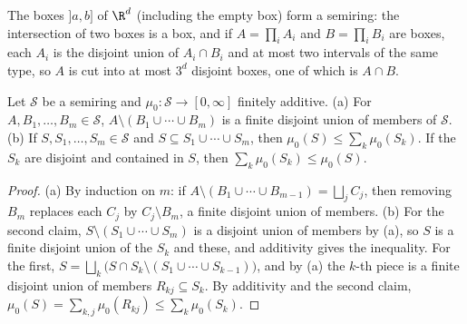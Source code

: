 The boxes $]a,b]$ of $\R^d$ (including the empty box) form a semiring: the intersection of two boxes is a box, and if $A=\prod_iA_i$ and $B=\prod_iB_i$ are boxes, each
$A_i$ is the disjoint union of $A_i\cap B_i$ and at most two intervals of the same type, so $A$ is cut into at most $3^d$ disjoint boxes, one of which is $A\cap B$.

\begin{lemma}\label{lem:semiring}
Let $\mathcal S$ be a semiring and $\mu_0:\mathcal S\to[0,\infty]$ finitely additive. (a) For $A,B_1,\dots,B_m\in\mathcal S$, $A\setminus(B_1\cup\cdots\cup B_m)$ is a finite disjoint union of members of $\mathcal S$.
(b) If $S,S_1,\dots,S_m\in\mathcal S$ and $S\subseteq S_1\cup\cdots\cup S_m$, then $\mu_0(S)\le\sum_k\mu_0(S_k)$. If the $S_k$ are disjoint and contained in $S$, then $\sum_k\mu_0(S_k)\le\mu_0(S)$.
\end{lemma}
\begin{proof}
(a) By induction on $m$: if $A\setminus(B_1\cup\cdots\cup B_{m-1})=\bigsqcup_jC_j$, then removing $B_m$ replaces each $C_j$ by $C_j\setminus B_m$, a finite disjoint union of members.
(b) For the second claim, $S\setminus(S_1\cup\cdots\cup S_m)$ is a disjoint union of members by (a), so $S$ is a finite disjoint union of the $S_k$ and these, and additivity
gives the inequality. For the first, $S=\bigsqcup_k\bigl(S\cap S_k\setminus(S_1\cup\cdots\cup S_{k-1})\bigr)$, and by (a) the $k$-th piece is a finite disjoint union of members $R_{kj}\subseteq S_k$. By
additivity and the second claim, $\mu_0(S)=\sum_{k,j}\mu_0(R_{kj})\le\sum_k\mu_0(S_k)$.
\end{proof}

